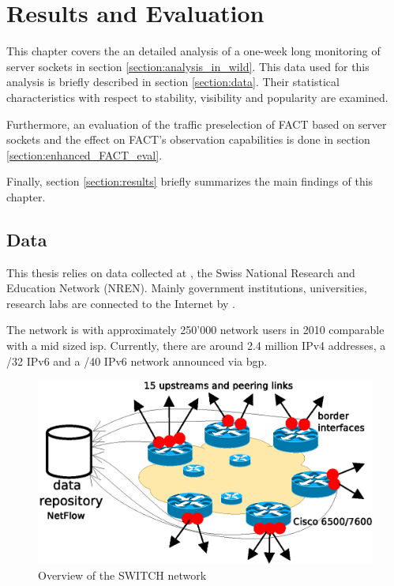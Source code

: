 

\chapter{Results and Evaluation 
\label{chapter:results}}

This chapter covers the an detailed analysis of a one-week long monitoring of server sockets in section \ref{section:analysis_in_wild}.
This data used for this analysis is briefly described in section \ref{section:data}.
Their statistical characteristics with respect to stability, visibility and popularity are examined. 

Furthermore, an evaluation of the traffic preselection of \gls{FACT} based on server sockets and the effect on \gls{FACT}'s observation capabilities is done in section \ref{section:enhanced_FACT_eval}.

Finally, section \ref{section:results} briefly summarizes the main findings of this chapter. 


\section{Data 
\label{section:data}}

This thesis relies on data collected at \citet{switch}, the Swiss National Research and Education Network (NREN). 
Mainly government institutions, universities, research labs are connected to the Internet by \citet{switch}\citep{Schatzmann:Mining}.

The \citet{switch} network is with approximately 250'000 network users in 2010 comparable with a mid sized \gls{isp}. Currently, there are around 2.4 million \gls{IPv4} addresses, a /32 IPv6 and a /40 \gls{IPv6} network announced via \gls{bgp}\citep{Schatzmann:Tracing}.
\begin{figure}
	[ht] \centering 
	\includegraphics[width=12cm]{images/network_overview.eps} \caption{Overview of the SWITCH network \citep{SchatzmanThesis2012}} 
	\label{fig:switch_nework} 
\end{figure}

